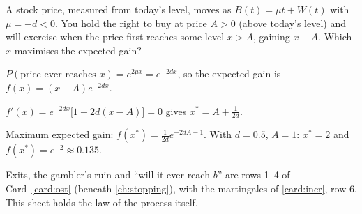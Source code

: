 \begin{pic}
\end{pic}

\begin{example}
\label{ex:sell}
A stock price, measured from today's level, moves as $B(t)=\mu t+W(t)$ with $\mu=-d<0$. You hold the right to buy at price $A>0$ (above today's level) and will exercise when the price first reaches some level $x>A$, gaining $x-A$. Which $x$ maximises the expected gain?
\begin{steps}
  \item $P(\text{price ever reaches }x)=e^{2\mu x}=e^{-2dx}$, so the expected gain is $f(x)=(x-A)e^{-2dx}$.
  \item $f'(x)=e^{-2dx}\big[1-2d(x-A)\big]=0$ gives $x^*=A+\frac{1}{2d}$.
  \item Maximum expected gain: $f(x^*)=\frac{1}{2d}e^{-2dA-1}$. With $d=0.5$, $A=1$: $x^*=2$ and $f(x^*)=e^{-2}\approx0.135$.
\end{steps}
\end{example}


Exits, the gambler's ruin and ``will it ever reach $b$'' are rows 1--4 of Card~\ref{card:ost} (beneath \cref{ch:stopping}), with the martingales of \cref{card:incr}, row 6. This sheet holds the law of the process itself.

